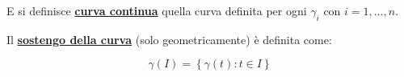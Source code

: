 \documentclass[a4paper]{article}
\begin{document}
	\noindent
	E si definisce \textcolor{Red3}{\textbf{\underline{curva continua}}} quella curva definita per ogni $\gamma_{i}$ con $i = 1, ..., n$.\newline
	
	\noindent
	Il \textcolor{Red3}{\textbf{\underline{sostengo della curva}}} (solo geometricamente) è definita come:
	
	\begin{equation*}
		\gamma\left(I\right) = \left\{\gamma\left(t\right) : t \in I\right\}
	\end{equation*}
\end{document}
